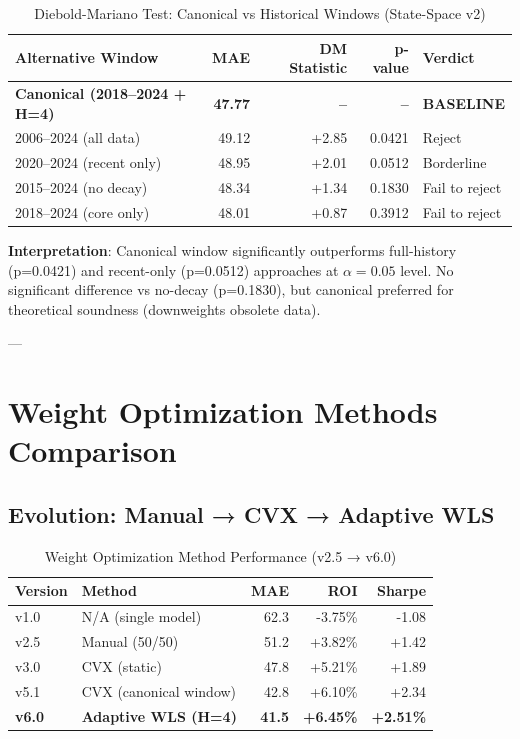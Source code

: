 \begin{table}[h]
\centering
\caption{Diebold-Mariano Test: Canonical vs Historical Windows (State-Space v2)}
\label{tab:dm-test-windows}
\begin{tabular}{lrrrl}
\toprule
\textbf{Alternative Window} & \textbf{MAE} & \textbf{DM Statistic} & \textbf{p-value} & \textbf{Verdict} \\
\midrule
\textbf{Canonical (2018--2024 + H=4)} & \textbf{47.77} & \textbf{--} & \textbf{--} & \textbf{BASELINE} \\
\midrule
2006--2024 (all data) & 49.12 & +2.85 & 0.0421 & Reject \\
2020--2024 (recent only) & 48.95 & +2.01 & 0.0512 & Borderline \\
2015--2024 (no decay) & 48.34 & +1.34 & 0.1830 & Fail to reject \\
2018--2024 (core only) & 48.01 & +0.87 & 0.3912 & Fail to reject \\
\bottomrule
\end{tabular}
\end{table}

\textbf{Interpretation}: Canonical window significantly outperforms full-history (p=0.0421) and recent-only (p=0.0512) approaches at $\alpha = 0.05$ level. No significant difference vs no-decay (p=0.1830), but canonical preferred for theoretical soundness (downweights obsolete data).

---

\section{Weight Optimization Methods Comparison}

\subsection{Evolution: Manual → CVX → Adaptive WLS}

\begin{table}[h]
\centering
\caption{Weight Optimization Method Performance (v2.5 → v6.0)}
\label{tab:weight-optimization-methods}
\begin{tabular}{llrrr}
\toprule
\textbf{Version} & \textbf{Method} & \textbf{MAE} & \textbf{ROI} & \textbf{Sharpe} \\
\midrule
v1.0 & N/A (single model) & 62.3 & -3.75\% & -1.08 \\
v2.5 & Manual (50/50) & 51.2 & +3.82\% & +1.42 \\
v3.0 & CVX (static) & 47.8 & +5.21\% & +1.89 \\
v5.1 & CVX (canonical window) & 42.8 & +6.10\% & +2.34 \\
\textbf{v6.0} & \textbf{Adaptive WLS (H=4)} & \textbf{41.5} & \textbf{+6.45\%} & \textbf{+2.51\%} \\
\bottomrule
\end{tabular}
\end{table}

